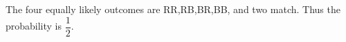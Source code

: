 The four equally likely outcomes are RR,RB,BR,BB, and two match. Thus the probability is $\boxed{\dfrac{1}{2}}$.

